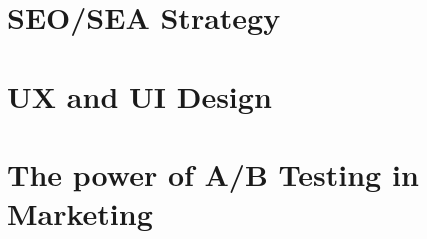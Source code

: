 \vspace{-1.2cm}

\section{SEO/SEA Strategy}

\section{UX and UI Design}

\section{The power of A/B Testing in Marketing}
